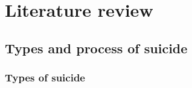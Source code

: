 
\chapter{Literature review}
	\label{chapter:a-new-hope}

\section{Types and process of suicide}

\subsection*{Types of suicide}

